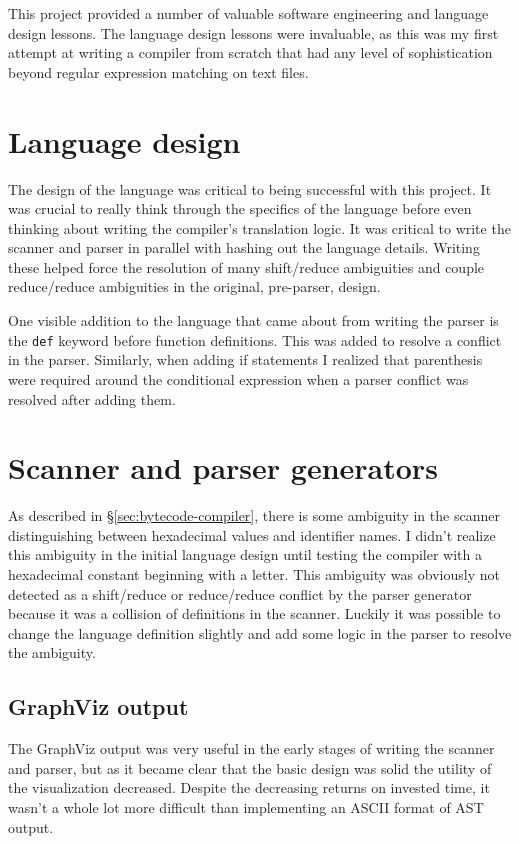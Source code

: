 This project provided a number of valuable software engineering and language design lessons.  The language design lessons were invaluable, as this was my first attempt at writing a compiler from scratch that had any level of sophistication beyond regular expression matching on text files.

\section{Language design}
The design of the language was critical to being successful with this project.  It was crucial to really think through the specifics of the language before even thinking about writing the compiler's translation logic.  It was critical to write the scanner and parser in parallel with hashing out the language details.  Writing these helped force the resolution of many shift/reduce ambiguities and couple reduce/reduce ambiguities in the original, pre-parser, design.

One visible addition to the language that came about from writing the parser is the \texttt{def} keyword before function definitions.  This was added to resolve a conflict in the parser.  Similarly, when adding if statements I realized that parenthesis were required around the conditional expression when a parser conflict was resolved after adding them.

\section{Scanner and parser generators}
As described in \S\ref{sec:bytecode-compiler}, there is some ambiguity in the scanner distinguishing between hexadecimal values and identifier names.  I didn't realize this ambiguity in the initial language design until testing the compiler with a hexadecimal constant beginning with a letter.  This ambiguity was obviously not detected as a shift/reduce or reduce/reduce conflict by the parser generator because it was a collision of definitions in the scanner.  Luckily it was possible to change the language definition slightly and add some logic in the parser to resolve the ambiguity.

\subsection{GraphViz output}
The GraphViz output was very useful in the early stages of writing the scanner and parser, but as it became clear that the basic design was solid the utility of the visualization decreased.  Despite the decreasing returns on invested time, it wasn't a whole lot more difficult than implementing an ASCII format of AST output.

